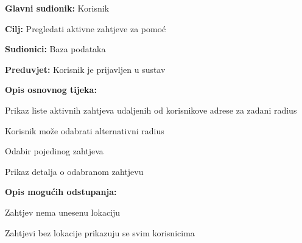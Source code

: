 					\noindent {}
					\begin{packed_item}
	
						\item \textbf{Glavni sudionik: }Korisnik
						\item  \textbf{Cilj:} Pregledati aktivne zahtjeve za pomoć
						\item  \textbf{Sudionici:} Baza podataka
						\item  \textbf{Preduvjet:} Korisnik je prijavljen u sustav
						\item  \textbf{Opis osnovnog tijeka:}
						
						\item[] \begin{packed_enum}
	
							\item Prikaz liste aktivnih zahtjeva udaljenih od korisnikove adrese za zadani radius 
							\item Korisnik može odabrati alternativni radius
							\item Odabir pojedinog zahtjeva
							\item Prikaz detalja o odabranom zahtjevu
						\end{packed_enum}
						
						\item  \textbf{Opis mogućih odstupanja:}
						
						\item[] \begin{packed_item}
	
							\item[1.a] Zahtjev nema unesenu lokaciju
							\item[] \begin{packed_enum}
								
								\item Zahtjevi bez lokacije prikazuju se svim korisnicima
							
							\end{packed_enum}
							
							
						\end{packed_item}
					\end{packed_item}
				
				
				
